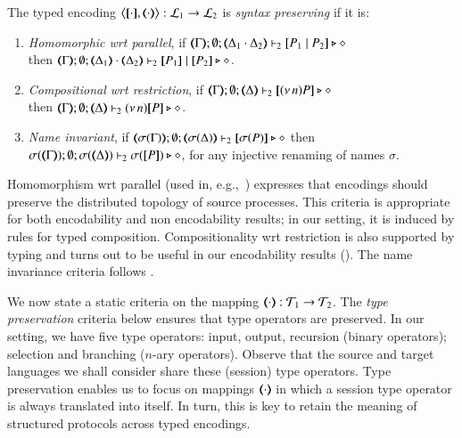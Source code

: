 \begin{definition}\rm
	\label{def:sep}
	The typed encoding 
	$\enco{\map{\cdot}, \mapt{\cdot}}: \tyl{L}_1 \to \tyl{L}_2$ is \emph{syntax preserving}
	if it is:
	
	\begin{enumerate}[1.]
		\item	\emph{Homomorphic wrt parallel},   if 
		$\mapt{\Gamma}; \emptyset; \mapt{\Delta_1 \cat \Delta_2} \proves_2 \map{P_1 \Par P_2} \hastype \Proc$ \\
		then 
		$\mapt{\Gamma}; \emptyset; \mapt{\Delta_1} \cat \mapt{\Delta_2} \proves_2 \map{P_1} \Par \map{P_2} \hastype \Proc$.

		\item	\emph{Compositional wrt restriction},  if 
		$\mapt{\Gamma}; \emptyset; \mapt{\Delta} \proves_2 \map{\news{n}P} \hastype \Proc$ \\
		then 
		$\mapt{\Gamma}; \emptyset; \mapt{\Delta} \proves_2 \news{n}\map{P} \hastype \Proc$.
		
		\item \emph{Name invariant},   if
		$\mapt{\sigma(\Gamma)}; \emptyset; \mapt{\sigma(\Delta)} \proves_2 \map{\sigma(P)} \hastype \Proc$
		then \\
		$\sigma(\mapt{\Gamma}); \emptyset; \sigma(\mapt{\Delta}) \proves_2 \sigma(\map{P}) \hastype \Proc$, 
		for any injective renaming  of names $\sigma$.
	\end{enumerate}
\end{definition}

\smallskip 

\noi Homomorphism wrt parallel (used in, e.g.,~\cite{Palamidessi03,DBLP:conf/lics/PalamidessiSVV06})
expresses that encodings should preserve the distributed topology of source processes. This criteria 
 is appropriate for both encodability and non encodability results; in our setting, it is
induced by rules for typed composition.
Compositionality wrt restriction 
is also supported by typing and turns out to be 
useful in our encodability results ().
The name invariance criteria follows \cite{DBLP:journals/iandc/Gorla10,DBLP:conf/icalp/LanesePSS10}. 

We now state a static criteria on the mapping 
$(\!\!\langle\cdot\rangle\!\!): {\cal{T}}_1 \to {\cal{T}}_2$. %
The \emph{type preservation} criteria below ensures that type operators are preserved.
In our setting, 
we have five type operators: input, output, recursion (binary operators); selection and 
branching ($n$-ary operators). 
Observe that the source and target languages we shall consider share these (session) type operators.
Type preservation enables us to focus on 
mappings $(\!\!\langle\cdot\rangle\!\!)$ in which a session type operator is always translated into itself. 
In turn, this is key to retain the meaning of structured protocols across typed encodings.

